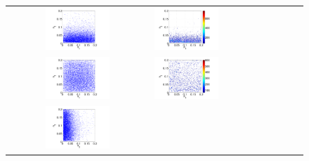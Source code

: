  \begin{figure}[ht]
        \begin{tabular}{clc}
\includegraphics[width=0.475\textwidth]{./figures/2sample12.pdf} &
\includegraphics[width=0.475\textwidth]{./figures/2jpdf12.pdf} \\
\includegraphics[width=0.475\textwidth]{./figures/2sample13.pdf} &
\includegraphics[width=0.475\textwidth]{./figures/2jpdf13.pdf} \\
\includegraphics[width=0.475\textwidth]{./figures/2sample23.pdf} &

\end{tabular}
\end{figure}
